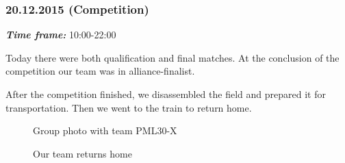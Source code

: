 \subsubsection{20.12.2015 (Competition)}
\textit{\textbf{Time frame:}} 10:00-22:00 

Today there were both qualification and final matches. At the conclusion of the competition our team was in alliance-finalist.

After the competition finished, we disassembled the field and prepared it for transportation. Then we went to the train to return home.

\begin{figure}[H]
	\begin{minipage}[h]{0.47\linewidth}
		\caption{Group photo with team PML30-X}
	\end{minipage}
	\hfill
	\begin{minipage}[h]{0.47\linewidth}
		\caption{Our team returns home}
	\end{minipage}
\end{figure}
